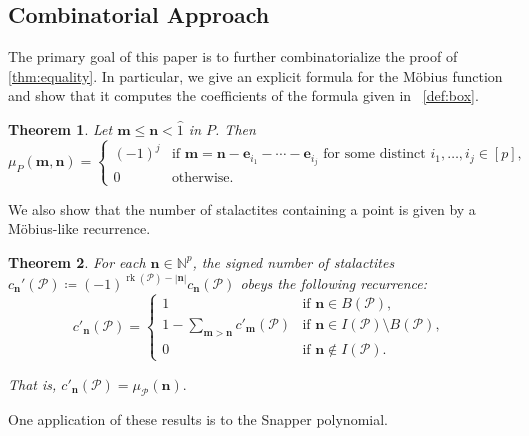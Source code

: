 \documentclass[a4paper, 11pt]{amsart}
\newtheorem{theorem}{Theorem}[section]
\theoremstyle{definition}
\newcommand{\bfm}{\mathbf{m}}
\newcommand{\bfn}{\mathbf{n}}
\newcommand{\bfe}{\mathbf{e}}
\newcommand{\sP}{\mathscr{P}}
\newcommand{\N}{\mathbb{N}}
\newcommand{\ds}{\displaystyle}
\DeclareMathOperator{\rk}{rk}
\begin{document}
\subsection{Combinatorial Approach} The primary goal of this paper is to further combinatorialize the proof of \autoref{thm:equality}. In particular, we give an explicit formula for the M\"obius function and show that it computes the coefficients of the formula given in ~\autoref{def:box}. 

\begin{theorem}\label{thm:mob value} Let $\bfm \le \bfn < \hat{1}$ in $P$. Then  \[\mu_P(\bfm,\bfn) = \begin{cases}
    (-1)^j & \text{if } \bfm = \bfn-\bfe_{i_1}-\cdots - \bfe_{i_j} \text{ for some distinct } i_1, \ldots, i_j \in [p],\\
    0 & \text{otherwise.}
\end{cases}\]
\end{theorem}

We also show that the number of stalactites containing a point is given by a M\"obius-like recurrence. 

\begin{theorem} \label{thm:stal mob}
    For each $\bfn \in \N^p$, the signed number of stalactites $c_\bfn'(\sP) \coloneqq (-1)^{\rk(\sP) - |\bfn|}c_\bfn(\sP)$ obeys the following recurrence: 
    $$c'_\bfn(\sP) = \begin{cases}
    1 & \text{if } \bfn \in B(\sP),\\
1-\ds\sum_{\bfm >\bfn} c'_\bfm(\sP) &\text{if } \bfn \in I(\sP) \setminus B(\sP),\\
0 & \text{if }\bfn \notin I(\sP). 
    \end{cases}
    $$

\noindent    That is, $c'_\bfn(\sP) = \mu_\sP(\bfn).$
\end{theorem}

One application of these results is to the Snapper polynomial. 
\end{document}
